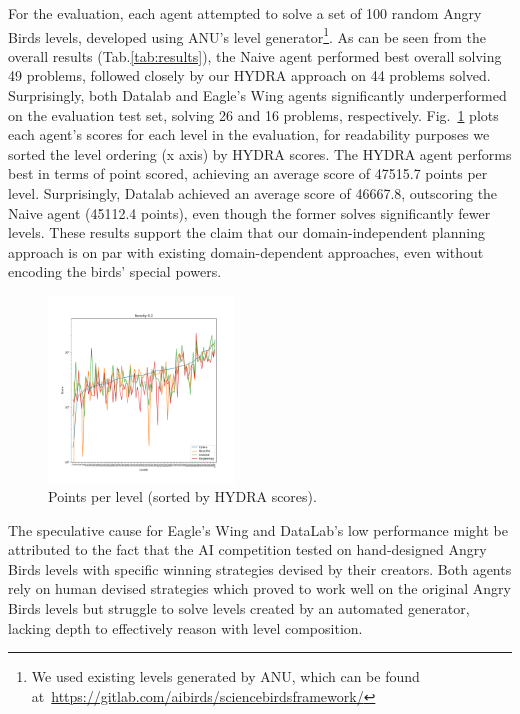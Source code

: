 For the evaluation, each agent attempted to solve a set of 100 random Angry Birds levels, developed using ANU's level generator\footnote{We used existing levels generated by ANU, which can be found at~\url{https://gitlab.com/aibirds/sciencebirdsframework/}}. As can be seen from the overall results (Tab.\ref{tab:results}), the Naive agent performed best overall solving 49 problems, followed closely by our HYDRA approach on 44 problems solved. Surprisingly, both Datalab and Eagle's Wing agents significantly underperformed on the evaluation test set, solving 26 and 16 problems, respectively. Fig.~\ref{fig:scores-plot} plots each agent's scores for each level in the evaluation, for readability purposes we sorted the level ordering (x axis) by HYDRA scores. The HYDRA agent performs best in terms of point scored, achieving an average score of 47515.7 points per level. Surprisingly, Datalab achieved an average score of 46667.8, outscoring the Naive agent (45112.4 points), even though the former solves significantly fewer levels. These results support the claim that our domain-independent planning approach is on par with existing domain-dependent approaches, even without encoding the birds' special powers.

\setlength{\belowcaptionskip}{-5pt}

\begin{figure}[htbp!]
\begin{center}
\includegraphics[trim= 50 45 50 82, clip, width=0.44\textwidth]{images/plot_novelty0_log.pdf}
\end{center}
\caption{Points per level (sorted by HYDRA scores).}
\label{fig:scores-plot}
\end{figure}

The speculative cause for Eagle's Wing and DataLab's low performance might be attributed to the fact that the AI competition tested on hand-designed Angry Birds levels with specific winning strategies devised by their creators. Both agents rely on human devised strategies which proved to work well on the original Angry Birds levels but struggle to solve levels created by an automated generator, lacking depth to effectively reason with level composition. 

